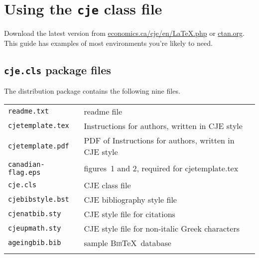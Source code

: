 \documentclass{cje}          %
\theoremstyle{plain}%
\theoremstyle{definition}
\theoremstyle{remark}
\begin{document}
\maketitle

\section{Using the \texttt{cje} class file}
Download the latest version from \href{http://economics.ca/cje/en/LaTeX.php}{economics.ca/cje/en/LaTeX.php} or \href{http://ctan.org/}{ctan.org}. This guide has examples of most environments you're likely to need. 

\subsection{\texttt{cje.cls} package files}
The distribution package contains the following nine files.\\[0.5\baselineskip]
\begin{tabular}{@{}ll}
\texttt{readme.txt}        & readme file\\
\texttt{cjetemplate.tex}      & Instructions for authors, written in CJE style\\
\texttt{cjetemplate.pdf}      & PDF of Instructions for authors, written in CJE style\\
\texttt{canadian-flag.eps} & figures~1 and 2, required for cjetemplate.tex\\
\texttt{cje.cls}           & CJE class file\\
\texttt{cjebibstyle.bst}           & CJE bibliography style file\\
\texttt{cjenatbib.sty}     & CJE style file for citations\\
\texttt{cjeupmath.sty}     & CJE style file for non-italic Greek characters\\
\texttt{ageingbib.bib}     & sample \textsc{Bib}\TeX\ database\\ 
\mbox{}\\
\end{tabular}
\end{document}
